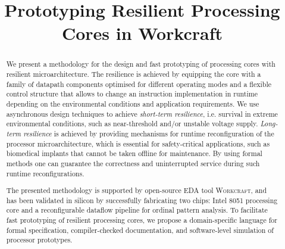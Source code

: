 \documentclass[conference]{IEEEtran}
\begin{document}
\title{Prototyping Resilient Processing Cores in Workcraft}

\vspace{-1mm}
\author{
}

\maketitle

\begin{abstract}
We present a methodology for the design and fast prototyping of
processing cores with resilient microarchitecture. The resilience is
achieved by equipping the core with a family of datapath components
optimised for different operating modes and a flexible control
structure that allows to change an instruction implementation in
runtime depending on the environmental conditions and application
requirements. We use asynchronous design techniques to achieve
\emph{short-term resilience}, i.e. survival in extreme environmental
conditions, such as near-threshold and/or unstable voltage supply.
\emph{Long-term resilience} is achieved by providing mechanisms for
runtime reconfiguration of the processor microarchitecture, which
is essential for safety-critical applications, such as biomedical
implants that cannot be taken offline for maintenance. By using
formal methods one can guarantee the correctness and uninterrupted
service during such runtime reconfigurations.

The presented methodology is supported by open-source EDA tool
\textsc{Workcraft}, and has been validated in silicon by successfully
fabricating two chips: Intel 8051 processing core and a
reconfigurable dataflow pipeline for ordinal pattern analysis.
To facilitate fast prototyping of resilient processing cores, we
propose a domain-specific language for formal specification,
compiler-checked documentation, and software-level simulation of
processor prototypes.
\end{abstract}

\end{document}
